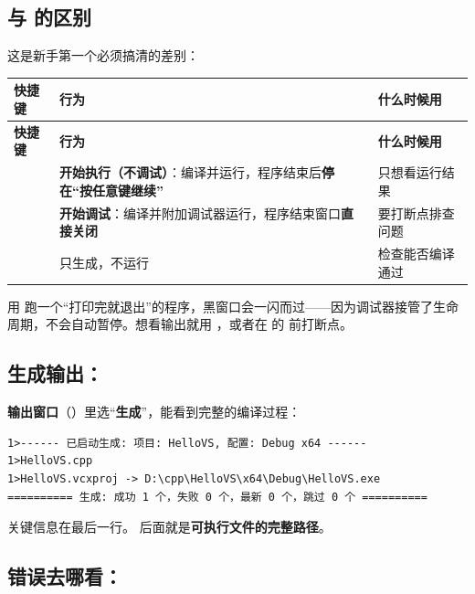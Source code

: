 \subsection{ 与  的区别}

这是新手第一个必须搞清的差别：

\begin{longtable}{L{2.8cm}L{7.4cm}L{4.4cm}}\toprule
\textbf{快捷键} & \textbf{行为} & \textbf{什么时候用} \\ \midrule \endfirsthead
\toprule \textbf{快捷键} & \textbf{行为} & \textbf{什么时候用} \\ \midrule \endhead
\bottomrule \endlastfoot
\textbf{} & \textbf{开始执行（不调试）}：编译并运行，程序结束后\textbf{停在“按任意键继续”} & 只想看运行结果 \\
\textbf{} & \textbf{开始调试}：编译并附加调试器运行，程序结束窗口\textbf{直接关闭} & 要打断点排查问题 \\
\textbf{} & 只生成，不运行 & 检查能否编译通过 \\
\end{longtable}

\begin{warnbox}[注意]
用  跑一个“打印完就退出”的程序，黑窗口会一闪而过——因为调试器接管了生命周期，不会自动暂停。想看输出就用 ，或者在  的  前打断点。
\end{warnbox}

\subsection{生成输出：}

\textbf{输出窗口}（）里选“\textbf{生成}”，能看到完整的编译过程：

\begin{lstlisting}[style=textstyle]
1>------ 已启动生成: 项目: HelloVS, 配置: Debug x64 ------
1>HelloVS.cpp
1>HelloVS.vcxproj -> D:\cpp\HelloVS\x64\Debug\HelloVS.exe
========== 生成: 成功 1 个，失败 0 个，最新 0 个，跳过 0 个 ==========
\end{lstlisting}

关键信息在最后一行。\code{->} 后面就是\textbf{可执行文件的完整路径}。

\subsection{错误去哪看：}

